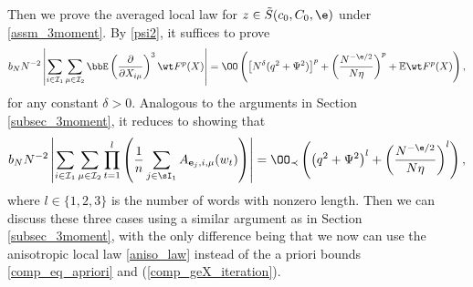 

Then we prove the averaged local law for $z\in \tilde S(c_0,C_0,\e)$ under \eqref{assm_3moment}. By \eqref{psi2}, it suffices to prove 
\begin{equation}\label{comp_avg_geX_self-improving-bound}
b_N N^{-2}\left|\sum_{i\in\mathcal I_1}\sum_{\mu\in\mathcal I_2}\bbE \left(\frac{\partial}{\partial X_{i\mu}}\right)^3\wt F^p(X)\right|=\OO\left(\left[N^\delta (q^2 +\Psi^2)\right]^p + \left( \frac{N^{-\e/2}}{N\eta}\right)^p+\mathbb E\wt F^p(X)\right),
\end{equation}
for any constant $\delta>0$. Analogous to the arguments in Section \ref{subsec_3moment}, it reduces to showing that
\begin{equation}\label{eq_comp_goalAvg_genX}
b_N N^{-2}\left|\sum_{i\in\mathcal I_1}\sum_{\mu\in\mathcal I_2} \prod_{t=1}^{l}\left(\frac{1}{n}\sum_{j\in\sI_1}A_{ \mathbf e_j, i, \mu}(w_t)\right)\right|=\OO_\prec\left(\left(q^2+\Psi^2\right)^{l} + \left( \frac{N^{-\e/2}}{N\eta}\right)^l\right),
\end{equation}
where $l\in \{1,2,3\}$ is the number of words with nonzero length. Then we can discuss these three cases using a similar argument as in Section \ref{subsec_3moment}, with the only difference being that we now can use the anisotropic local law \eqref{aniso_law} instead of the a priori bounds \eqref{comp_eq_apriori}  and (\ref{comp_geX_iteration}). %

%

